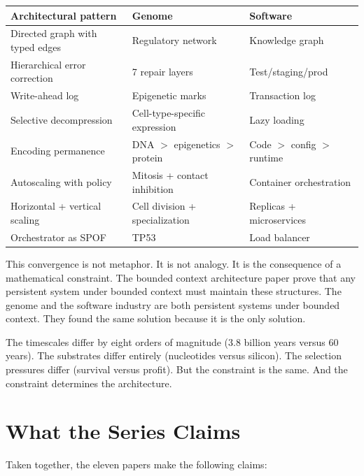 \documentclass[11pt]{article}
\theoremstyle{definition}
\begin{document}
\begin{center}
\small
\begin{tabular}{lll}
\toprule
\textbf{Architectural pattern} & \textbf{Genome} & \textbf{Software} \\
\midrule
Directed graph with typed edges & Regulatory network & Knowledge graph \\
Hierarchical error correction & 7 repair layers & Test/staging/prod \\
Write-ahead log & Epigenetic marks & Transaction log \\
Selective decompression & Cell-type-specific expression & Lazy loading \\
Encoding permanence & DNA $>$ epigenetics $>$ protein & Code $>$ config $>$ runtime \\
Autoscaling with policy & Mitosis + contact inhibition & Container orchestration \\
Horizontal + vertical scaling & Cell division + specialization & Replicas + microservices \\
Orchestrator as SPOF & TP53 & Load balancer \\
\bottomrule
\end{tabular}
\end{center}

This convergence is not metaphor. It is not analogy. It is the
consequence of a mathematical constraint. The bounded context architecture paper prove that
any persistent system under bounded context must maintain these
structures. The genome and the software industry are both persistent
systems under bounded context. They found the same solution because
it is the only solution.

The timescales differ by eight orders of magnitude (3.8 billion years
versus 60 years). The substrates differ entirely (nucleotides versus
silicon). The selection pressures differ (survival versus profit).
But the constraint is the same. And the constraint determines the
architecture.

\section{What the Series Claims}
\label{sec:claims}

Taken together, the eleven papers make the following claims:
\end{document}
